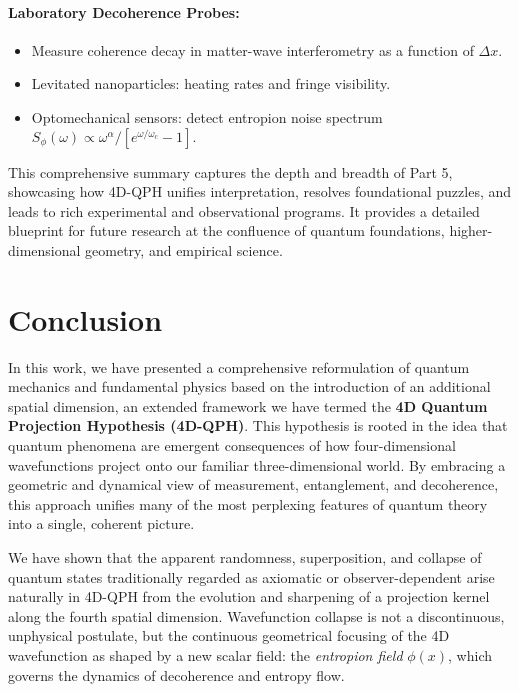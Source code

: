 \documentclass[12pt]{article}
\begin{document}
\paragraph{Laboratory Decoherence Probes:}
\begin{itemize}
  \item Measure coherence decay in matter-wave interferometry as a function of \(\Delta x\).  
  \item Levitated nanoparticles: heating rates and fringe visibility.  
  \item Optomechanical sensors: detect entropion noise spectrum  
    \(S_\phi(\omega)\propto\omega^\alpha/[e^{\omega/\omega_c}-1].\)
\end{itemize}

\noindent This comprehensive summary captures the depth and breadth of Part 5, showcasing how 4D-QPH unifies interpretation, resolves foundational puzzles, and leads to rich experimental and observational programs. It provides a detailed blueprint for future research at the confluence of quantum foundations, higher-dimensional geometry, and empirical science. 

\section*{Conclusion}

In this work, we have presented a comprehensive reformulation of quantum mechanics and fundamental physics based on the introduction of an additional spatial dimension, an extended framework we have termed the \textbf{4D Quantum Projection Hypothesis (4D-QPH)}. This hypothesis is rooted in the idea that quantum phenomena are emergent consequences of how four-dimensional wavefunctions project onto our familiar three-dimensional world. By embracing a geometric and dynamical view of measurement, entanglement, and decoherence, this approach unifies many of the most perplexing features of quantum theory into a single, coherent picture.

We have shown that the apparent randomness, superposition, and collapse of quantum states traditionally regarded as axiomatic or observer-dependent arise naturally in 4D-QPH from the evolution and sharpening of a projection kernel along the fourth spatial dimension. Wavefunction collapse is not a discontinuous, unphysical postulate, but the continuous geometrical focusing of the 4D wavefunction as shaped by a new scalar field: the \emph{entropion field} \(\phi(x)\), which governs the dynamics of decoherence and entropy flow.
\end{document}
